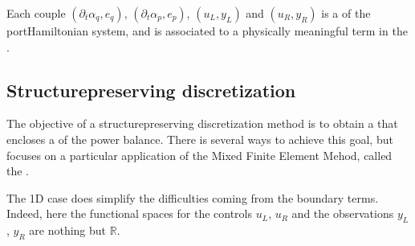 \documentclass[letterpaper,10pt,english]{sphinxmanual}
\begin{document}
\sphinxAtStartPar
Each couple \((\partial_t \alpha_q, e_q)\),
\((\partial_t \alpha_p, e_p)\), \((u_L, y_L)\) and
\((u_R, y_R)\) is a  of the port\sphinxhyphen{}Hamiltonian system, and is
associated to a physically meaningful term in the .


\subsection{Structure\sphinxhyphen{}preserving discretization}
\label{\detokenize{started:structure-preserving-discretization}}
\sphinxAtStartPar
The objective of a structure\sphinxhyphen{}preserving discretization method is to
obtain a  that encloses a
 of the power balance. There is several ways to
achieve this goal, but  focuses on a particular application of
the Mixed Finite Element Mehod, called the .

\sphinxAtStartPar
{} The 1D case does simplify the difficulties coming from the
boundary terms. Indeed, here the functional spaces for the controls
\(u_L\), \(u_R\) and the observations \(y_L\), \(y_R\)
are nothing but \(\mathbb{R}\).
\end{document}
